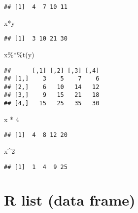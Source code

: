 \documentclass[
]{article}
\newenvironment{Shaded}{\begin{snugshade}}{\end{snugshade}}
\newcommand{\DecValTok}[1]{\textcolor[rgb]{0.00,0.00,0.81}{#1}}
\newcommand{\FunctionTok}[1]{\textcolor[rgb]{0.00,0.00,0.00}{#1}}
\newcommand{\NormalTok}[1]{#1}
\newcommand{\SpecialCharTok}[1]{\textcolor[rgb]{0.00,0.00,0.00}{#1}}
\begin{document}
\begin{verbatim}
## [1]  4  7 10 11
\end{verbatim}

\begin{Shaded}
\begin{Highlighting}[]
\NormalTok{x}\SpecialCharTok{*}\NormalTok{y}
\end{Highlighting}
\end{Shaded}

\begin{verbatim}
## [1]  3 10 21 30
\end{verbatim}

\begin{Shaded}
\begin{Highlighting}[]
\NormalTok{x}\SpecialCharTok{\%*\%}\FunctionTok{t}\NormalTok{(y)}
\end{Highlighting}
\end{Shaded}

\begin{verbatim}
##      [,1] [,2] [,3] [,4]
## [1,]    3    5    7    6
## [2,]    6   10   14   12
## [3,]    9   15   21   18
## [4,]   15   25   35   30
\end{verbatim}

\begin{Shaded}
\begin{Highlighting}[]
\NormalTok{x }\SpecialCharTok{*} \DecValTok{4}
\end{Highlighting}
\end{Shaded}

\begin{verbatim}
## [1]  4  8 12 20
\end{verbatim}

\begin{Shaded}
\begin{Highlighting}[]
\NormalTok{x}\SpecialCharTok{\^{}}\DecValTok{2}
\end{Highlighting}
\end{Shaded}

\begin{verbatim}
## [1]  1  4  9 25
\end{verbatim}

\hypertarget{r-list-data-frame}{%
\section{R list (data frame)}\label{r-list-data-frame}}
\end{document}
